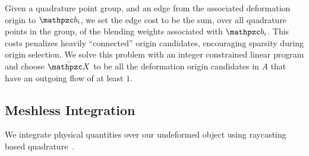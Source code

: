 Given a quadrature point group, and an edge from the associated deformation origin to $\prt_i$, we set the edge cost to be the sum, 
over all quadrature points in the group, of the blending weights associated with $\prt_i$.
This costs penalizes heavily ``connected'' origin candidates, encouraging sparsity during origin selection. 
We solve this problem with an integer constrained linear program and choose $\XBs$ to be all the deformation origin candidates in $A$ 
that have an outgoing flow of at least $1$. 

\subsection{Meshless Integration}
\label{sec:quadrature}
We integrate physical quantities over our undeformed object using raycasting based quadrature~\cite{KHOSRAVIFARD201030}.


